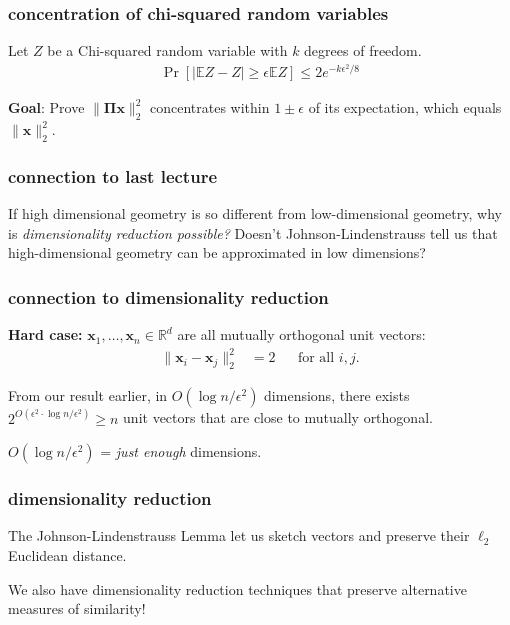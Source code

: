\documentclass[compress]{beamer}
\newcommand{\bs}[1]{\boldsymbol{#1}}
\newcommand{\bv}[1]{\mathbf{#1}}
\newcommand{\R}{\mathbb{R}}
\newcommand{\E}{\mathbb{E}}
\begin{document}
\begin{frame}[t]
	\frametitle{concentration of chi-squared random variables}
	\begin{lemma} Let $Z$ be a Chi-squared random variable with $k$ degrees of freedom. 
		\begin{align*}
			\Pr[|\E Z - Z| \geq \epsilon \E Z] \leq 2 e^{-k\epsilon^2/8}
		\end{align*}
	\end{lemma}
	
	\vspace{8em}
	\begin{block}{\vspace*{-3ex}}
		\small \textbf{Goal}: Prove $\|\bs{\Pi} \bv{x} \|_2^2$ concentrates within $1 \pm \epsilon$ of its expectation, which equals $\|\bv{x} \|_2^2$.
	\end{block}
\end{frame}







\begin{frame}
	\frametitle{connection to last lecture}
	If high dimensional geometry is so different from low-dimensional geometry, why is \emph{dimensionality reduction possible?} Doesn't Johnson-Lindenstrauss tell us that high-dimensional geometry can be approximated in low dimensions?
\end{frame}

\begin{frame}
	\frametitle{connection to dimensionality reduction}
	\textbf{Hard case:} $\bv{x}_1, \ldots, \bv{x}_n \in \R^d$ are all mutually orthogonal unit vectors: 
	\begin{align*}
		\|\bv{x}_i - \bv{x}_j\|_2^2 &= 2 & &\text{for all $i,j$.}  
	\end{align*}
	
	From our result earlier, in $O(\log n /\epsilon^2)$ dimensions, there exists $2^{O(\epsilon^2\cdot \log n /\epsilon^2)} \geq n $ unit vectors that are close to mutually orthogonal.
	
	$O(\log n /\epsilon^2)$ = \emph{just enough} dimensions. 
\end{frame}


%
\begin{frame}
	\frametitle{dimensionality reduction}
	\begin{center}
		The Johnson-Lindenstrauss Lemma let us sketch vectors and preserve their $\ell_2$ Euclidean distance. 
		
		We also have dimensionality reduction techniques that preserve alternative measures of similarity!
	\end{center}
\end{frame}
\end{document}
